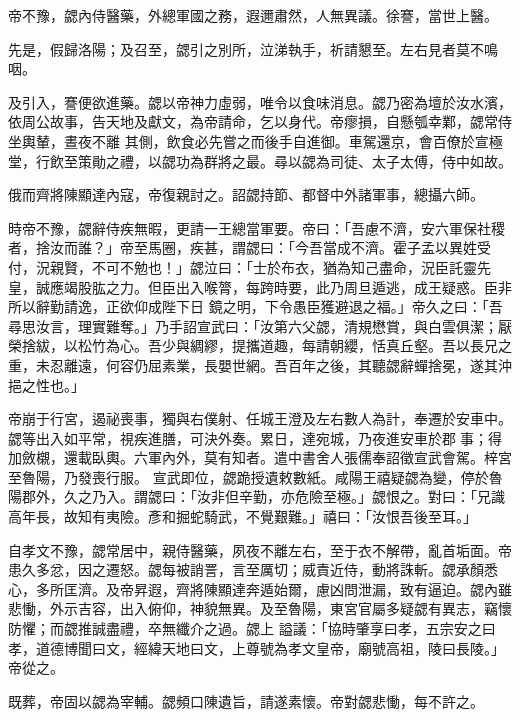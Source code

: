 \begin{pinyinscope}
 帝不豫，勰內侍醫藥，外總軍國之務，遐邇肅然，人無異議。徐謇，當世上醫。



 先是，假歸洛陽；及召至，勰引之別所，泣涕執手，祈請懇至。左右見者莫不鳴咽。



 及引入，謇便欲進藥。勰以帝神力虛弱，唯令以食味消息。勰乃密為壇於汝水濱，依周公故事，告天地及獻文，為帝請命，乞以身代。帝瘳損，自懸瓠幸鄴，勰常侍坐輿輦，晝夜不離
 其側，飲食必先嘗之而後手自進御。車駕還京，會百僚於宣極堂，行飲至策勛之禮，以勰功為群將之最。尋以勰為司徒、太子太傅，侍中如故。



 俄而齊將陳顯達內寇，帝復親討之。詔勰持節、都督中外諸軍事，總攝六師。



 時帝不豫，勰辭侍疾無暇，更請一王總當軍要。帝曰：「吾慮不濟，安六軍保社稷者，捨汝而誰？」帝至馬圈，疾甚，謂勰曰：「今吾當成不濟。霍子孟以異姓受付，況親賢，不可不勉也！」勰泣曰：「士於布衣，猶為知己盡命，況臣託靈先皇，誠應竭股肱之力。但臣出入喉膂，每跨時要，此乃周旦遁逃，成王疑惑。臣非所以辭勤請逸，正欲仰成陛下日
 鏡之明，下令愚臣獲避退之福。」帝久之曰：「吾尋思汝言，理實難奪。」乃手詔宣武曰：「汝第六父勰，清規懋賞，與白雲俱潔；厭榮捨紱，以松竹為心。吾少與綢繆，提攜道趣，每請朝纓，恬真丘壑。吾以長兄之重，未忍離遠，何容仍屈素業，長嬰世網。吾百年之後，其聽勰辭蟬捨冕，遂其沖挹之性也。」



 帝崩于行宮，遏祕喪事，獨與右僕射、任城王澄及左右數人為計，奉遷於安車中。勰等出入如平常，視疾進膳，可決外奏。累日，達宛城，乃夜進安車於郡事；得加斂櫬，還載臥輿。六軍內外，莫有知者。遣中書舍人張儒奉詔徵宣武會駕。梓宮至魯陽，乃發喪行服。
 宣武即位，勰跪授遺敕數紙。咸陽王禧疑勰為變，停於魯陽郡外，久之乃入。謂勰曰：「汝非但辛勤，亦危險至極。」勰恨之。對曰：「兄識高年長，故知有夷險。彥和掘蛇騎武，不覺艱難。」禧曰：「汝恨吾後至耳。」



 自孝文不豫，勰常居中，親侍醫藥，夙夜不離左右，至于衣不解帶，亂首垢面。帝患久多忿，因之遷怒。勰每被誚詈，言至厲切；威責近侍，動將誅斬。勰承顏悉心，多所匡濟。及帝昇遐，齊將陳顯達奔遁始爾，慮凶問泄漏，致有逼迫。勰內雖悲慟，外示吉容，出入俯仰，神貌無異。及至魯陽，東宮官屬多疑勰有異志，竊懷防懼；而勰推誠盡禮，卒無纖介之過。勰上
 謚議：「協時肇享曰孝，五宗安之曰孝，道德博聞曰文，經緯天地曰文，上尊號為孝文皇帝，廟號高祖，陵曰長陵。」帝從之。



 既葬，帝固以勰為宰輔。勰頻口陳遺旨，請遂素懷。帝對勰悲慟，每不許之。




\end{pinyinscope}
